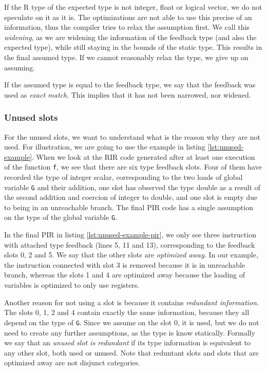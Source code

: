 If the R type of the expected type is not integer, float or logical vector, we do not speculate on it as it is. The optimizations are not able to use this precise of an information, thus the compiler tries to relax the assumption first. We call this \textit{widening}, as we are widening the information of the feedback type (and also the expected type), while still staying in the bounds of the static type. This results in the final assumed type. If we cannot reasonably relax the type, we give up on assuming.

If the assumed type is equal to the feedback type, we say that the feedback was used as \textit{exact match}. This implies that it has not been narrowed, nor widened.

\subsubsection*{Unused slots}


For the unused slots, we want to understand what is the reason why they are not used. For illustration, we are going to use the example in listing \ref{lst:unused-example}. When we look at the RIR code generated after at least one execution of the function \texttt{f}, we see that there are six type feedback slots. Four of them have recorded the type of integer scalar, corresponding to the two loads of global variable \texttt{G} and their addition, one slot has observed the type double as a result of the second addition and coercion of integer to double, and one slot is empty due to being in an unreachable branch. The final PIR code has a single assumption on the type of the global variable \texttt{G}.

In the final PIR in listing \ref{lst:unused-example-pir}, we only see three instruction with attached type feedback (lines 5, 11 and 13), corresponding to the feedback slots 0, 2 and 5. We say that the other slots are \textit{optimized away}. In our example, the instruction connected with slot 3 is removed because it is in unreachable branch, whereas the slots 1 and 4 are optimized away because the loading of variables is optimized to only use registers.

Another reason for not using a slot is because it contains \textit{redundant information}. The slots 0, 1, 2 and 4 contain exactly the same information, because they all depend on the type of \texttt{G}. Since we assume on the slot 0, it is used, but we do not need to create any further assumptions, as the type is know statically. Formally we say that an \textit{unused slot is redundant} if its type information is equivalent to any other slot, both used or unused. Note that reduntant slots and slots that are optimized away are not disjunct categories.

